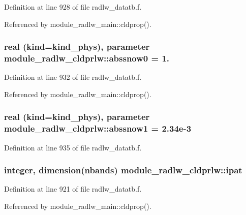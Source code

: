 Definition at line 928 of file radlw\+\_\+datatb.\+f.



Referenced by module\+\_\+radlw\+\_\+main\+::cldprop().

\subsubsection[{\texorpdfstring{abssnow0}{abssnow0}}]{\setlength{\rightskip}{0pt plus 5cm}real (kind=kind\+\_\+phys), parameter module\+\_\+radlw\+\_\+cldprlw\+::abssnow0 = 1.}\hypertarget{namespacemodule__radlw__cldprlw_a4bcd58c6a7e9abdfbb8f8ec7d925d143}{}\label{namespacemodule__radlw__cldprlw_a4bcd58c6a7e9abdfbb8f8ec7d925d143}


Definition at line 932 of file radlw\+\_\+datatb.\+f.



Referenced by module\+\_\+radlw\+\_\+main\+::cldprop().

\subsubsection[{\texorpdfstring{abssnow1}{abssnow1}}]{\setlength{\rightskip}{0pt plus 5cm}real (kind=kind\+\_\+phys), parameter module\+\_\+radlw\+\_\+cldprlw\+::abssnow1 = 2.\+34e-\/3}\hypertarget{namespacemodule__radlw__cldprlw_a7d12b328d9dec0c525a4b0824ae7ab44}{}\label{namespacemodule__radlw__cldprlw_a7d12b328d9dec0c525a4b0824ae7ab44}


Definition at line 935 of file radlw\+\_\+datatb.\+f.

\subsubsection[{\texorpdfstring{ipat}{ipat}}]{\setlength{\rightskip}{0pt plus 5cm}integer, dimension(nbands) module\+\_\+radlw\+\_\+cldprlw\+::ipat}\hypertarget{namespacemodule__radlw__cldprlw_a9e8ebd81d5d62c2be4c006a595493aed}{}\label{namespacemodule__radlw__cldprlw_a9e8ebd81d5d62c2be4c006a595493aed}


Definition at line 921 of file radlw\+\_\+datatb.\+f.



Referenced by module\+\_\+radlw\+\_\+main\+::cldprop().

